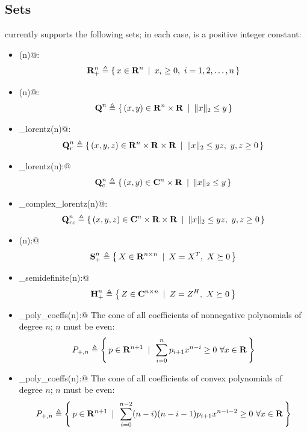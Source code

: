 \documentclass[12pt]{article}
\newcommand{\symm}{{\mbox{\bf S}}}  %
\newcommand{\herm}{{\mbox{\bf H}}}  %
\newcommand{\lorentz}{{\mbox{\bf Q}}}  %
\begin{document}
\subsection{Sets}

\cvx currently supports the following sets; in each case, \verb@n@ is a positive
integer constant:
\begin{itemize}
\item \verb@nonnegative(n)@:
\begin{equation*}
	\mathbf{R}^n_+ \triangleq \left\{\,x\in\mathbf{R}^{n}\,~|~\,x_i\geq 0,~i=1,2,\dots,n\,\right\}
\end{equation*}	
\item \verb@lorentz(n)@:
\begin{equation*}
\lorentz^n \eqbydef \Condset{(x,y)\in\R^n\times\R}{\|x\|_2\leq y}
\end{equation*}
\item \verb@rotated_lorentz(n)@: 
\begin{equation*}
\lorentz^n_r \eqbydef \Condset{(x,y,z)\in\R^n\times\R\times\R}{\|x\|_2\leq yz,~y,z\geq 0}
\end{equation*}
\item \verb@complex_lorentz(n):@ 
\begin{equation*}
\lorentz^n_c \eqbydef \Condset{(x,y)\in\complex^n\times\R}{\|x\|_2\leq y}
\end{equation*}
\item \verb@rotated_complex_lorentz(n)@: 
\begin{equation*}
\lorentz^n_{rc} \eqbydef \Condset{(x,y,z)\in\complex^n\times\R\times\R}{\|x\|_2\leq yz,~y,z\geq 0}
\end{equation*}
\item \verb@semidefinite(n):@ 
\begin{equation*}
\symm^n_+ \eqbydef \Condset{X\in\R^{n\times n}}{X=X^T,~X\succeq 0}
\end{equation*}
\item \verb@hermitian_semidefinite(n):@ 
\begin{equation*}
\herm^n_+ \eqbydef \Condset{Z\in\complex^{n\times n}}{Z=Z^H,~X\succeq 0}
\end{equation*}
\item \verb@nonneg_poly_coeffs(n):@ The cone of all coefficients of nonnegative
polynomials of degree $n$; $n$ must be even:
\begin{equation*}
P_{+,n} \eqbydef \Condset{p\in\Rn[n+1]}{\sum_{i=0}^n p_{i+1} x^{n-i} \geq 0 ~ \forall x\in\R }
\end{equation*}
\item \verb@convex_poly_coeffs(n):@ The cone of all coefficients of convex
polynomials of degree $n$; $n$ must be even:
\begin{equation*}
P_{+,n} \eqbydef \Condset{p\in\Rn[n+1]}{\sum_{i=0}^{n-2} (n-i)(n-i-1) p_{i+1} x^{n-i-2} \geq 0 ~ \forall x\in\R }
\end{equation*}
\end{itemize}
\end{document}

